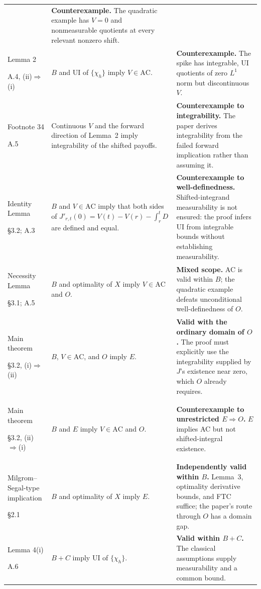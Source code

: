 \documentclass[11pt]{article}
\theoremstyle{remark}\newtheorem{remark}[theorem]{Remark}
\begin{document}
\begin{longtable}{@{}>{\raggedright\arraybackslash}p{2.60cm}>{\raggedright\arraybackslash}p{6.30cm}>{\raggedright\arraybackslash}p{6.45cm}@{}}
& \textbf{Counterexample.} The quadratic example has $V=0$ and nonmeasurable quotients at every relevant nonzero shift. \\
Lemma 2\par A.4, (ii)$\Rightarrow$(i)
& $B$ and UI of $\{\chi_h\}$ imply $V\in\mathrm{AC}$.
& \textbf{Counterexample.} The spike has integrable, UI quotients of zero $L^1$ norm but discontinuous $V$. \\
Footnote 34\par A.5
& Continuous $V$ and the forward direction of Lemma~2 imply integrability of the shifted payoffs.
& \textbf{Counterexample to integrability.} The paper derives integrability from the failed forward implication rather than assuming it. \\
Identity Lemma\par \S3.2; A.3
& $B$ and $V\in\mathrm{AC}$ imply that both sides of
$J'_{r,t}(0)=V(t)-V(r)-\int_r^t D$ are defined and equal.
& \textbf{Counterexample to well-definedness.} Shifted-integrand measurability is not ensured: the proof infers UI from integrable bounds without establishing measurability. \\
Necessity Lemma\par \S3.1; A.5
& $B$ and optimality of $X$ imply $V\in\mathrm{AC}$ and $O$.
& \textbf{Mixed scope.} AC is valid within $B$; the quadratic example defeats unconditional well-definedness of $O$. \\
Main theorem\par \S3.2, (i)$\Rightarrow$(ii)
& $B$, $V\in\mathrm{AC}$, and $O$ imply $E$.
& \textbf{Valid with the ordinary domain of $O$.} The proof must explicitly use the integrability supplied by $J$'s existence near zero, which $O$ already requires. \\
Main theorem\par \S3.2, (ii)$\Rightarrow$(i)
& $B$ and $E$ imply $V\in\mathrm{AC}$ and $O$.
& \textbf{Counterexample to unrestricted $E\Rightarrow O$.} $E$ implies AC but not shifted-integral existence. \\
Milgrom--Segal-type implication\par \S2.1
& $B$ and optimality of $X$ imply $E$.
& \textbf{Independently valid within $B$.} Lemma~3, optimality derivative bounds, and FTC suffice; the paper's route through $O$ has a domain gap. \\
Lemma 4(i)\par A.6
& $B+C$ imply UI of $\{\chi_h\}$.
& \textbf{Valid within $B+C$.} The classical assumptions supply measurability and a common bound. \\

\end{longtable}
\end{document}
